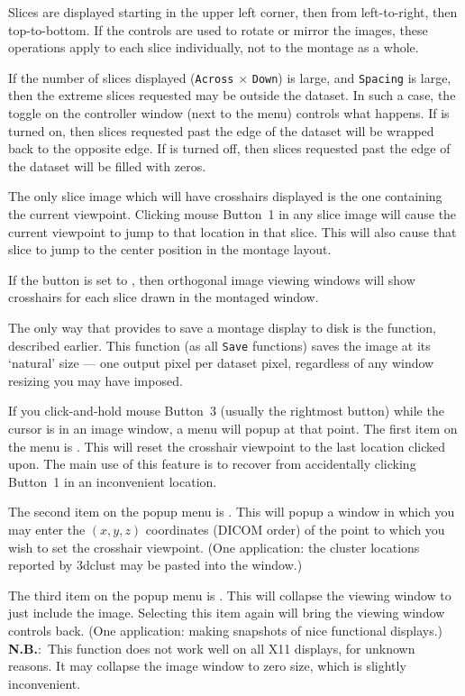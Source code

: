 Slices are displayed starting in the
upper left corner, then from left-to-right, then top-to-bottom.
If the  controls are used to rotate or mirror the images,
these operations apply to each slice individually, not to the montage
as a whole.

If the number of slices displayed ({\tt Across}$\,\times\,${\tt Down})
is large, and {\tt Spacing} is large, then the extreme slices requested
may be outside the dataset.  In such a case,
the toggle  on the \afnit controller window (next to the
 menu)  controls what happens.  If  is turned
on, then slices requested past the edge of the dataset will be wrapped
back to the opposite edge.  If  is turned off, then
slices requested past the edge of the dataset will be filled with zeros.

The only slice image which will have crosshairs displayed is the one
containing the current viewpoint.  Clicking mouse Button~1 in
any slice image will cause the current viewpoint to jump to that
location in that slice.  This will also cause that slice to jump
to the center position in the montage layout.

If the  button is set to , then orthogonal
image viewing windows will show crosshairs for each slice drawn
in the montaged window.

The only way that \afnit provides to save a montage display to
disk is the  function, described earlier.
This function (as all {\tt Save} functions) saves the
image at its `natural' size --- one output pixel per dataset pixel,
regardless of any window resizing you may have imposed.

If you click-and-hold mouse Button~3 (usually the rightmost button)
while the cursor is in an image
window, a menu will popup at that point.  The first item on the
menu is .  This will reset the crosshair viewpoint to
the last location clicked upon.  The main use of this feature is to
recover from accidentally clicking Button~1 in an inconvenient location.

The second item on the popup menu is .  This will popup
a window in which you may enter the $(x,y,z)$ coordinates (DICOM order)
of the point to which you wish to set the crosshair viewpoint.
(One application: the cluster locations reported by {\sf 3dclust}
may be pasted into the window.)

The third item on the popup menu is .  This will collapse
the viewing window to just include the image.  Selecting this item again
will bring the viewing window controls back.
(One application: making snapshots of nice functional displays.)
{\bf N.B.}:~This function does not work well on all X11 displays, for
unknown reasons.  It may collapse the image window to zero size, which
is slightly inconvenient.

